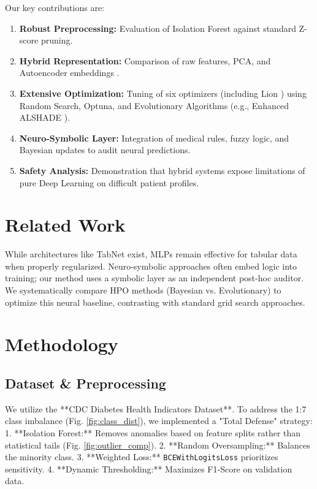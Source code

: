 \documentclass[conference]{IEEEtran}
\begin{document}
Our key contributions are:
\begin{enumerate}
    \item \textbf{Robust Preprocessing:} Evaluation of Isolation Forest \cite{cheng2019iforest} against standard Z-score pruning.
    \item \textbf{Hybrid Representation:} Comparison of raw features, PCA, and Autoencoder embeddings \cite{tschannen2018ae}.
    \item \textbf{Extensive Optimization:} Tuning of six optimizers (including Lion \cite{chen2023lion}) using Random Search, Optuna, and Evolutionary Algorithms (e.g., Enhanced ALSHADE \cite{karpinski2025deullm}).
    \item \textbf{Neuro-Symbolic Layer:} Integration of medical rules, fuzzy logic, and Bayesian updates to audit neural predictions.
    \item \textbf{Safety Analysis:} Demonstration that hybrid systems expose limitations of pure Deep Learning on difficult patient profiles.
\end{enumerate}

\section{Related Work}
While architectures like TabNet exist, MLPs remain effective for tabular data when properly regularized. Neuro-symbolic approaches often embed logic into training; our method uses a symbolic layer as an independent post-hoc auditor. We systematically compare HPO methods (Bayesian vs. Evolutionary) to optimize this neural baseline, contrasting with standard grid search approaches.

\section{Methodology}

\subsection{Dataset & Preprocessing}
We utilize the **CDC Diabetes Health Indicators Dataset**. To address the 1:7 class imbalance (Fig. \ref{fig:class_dist}), we implemented a "Total Defense" strategy:
1.  **Isolation Forest:** Removes anomalies based on feature splits rather than statistical tails (Fig. \ref{fig:outlier_comp}).
2.  **Random Oversampling:** Balances the minority class.
3.  **Weighted Loss:** \texttt{BCEWithLogitsLoss} prioritizes sensitivity.
4.  **Dynamic Thresholding:** Maximizes F1-Score on validation data.
\end{document}
